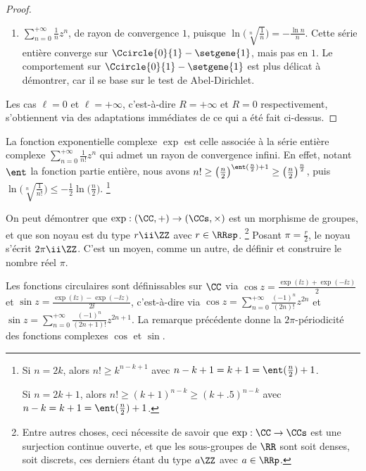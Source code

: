 \begin{proof}
\begin{itemize}
\begin{enumerate}[label=(\alph*)]
	        \item $\sum_{n=0}^{+\infty}  \frac{1}{n} z^n$, 
	        de rayon de convergence $1$,
	        puisque 
	        $ \ln \big( \sqrt[n]{\frac{1}{n}} \big)
	        = -\frac{\ln n}{n}$.
	        Cette série entière converge sur $\Ccircle{0}{1} - \setgene{1}$, mais pas en $1$. 
	        Le comportement sur $\Ccircle{0}{1} - \setgene{1}$ est plus délicat à démontrer, car il se base sur le test de Abel-Dirichlet.
	    \end{enumerate}
    \end{itemize}


    Les cas $\ell = 0$ et $\ell = +\infty$,
    c'est-à-dire $R = +\infty$ et $R = 0$ respectivement,
    s'obtiennent via des adaptations immédiates de ce qui a été fait ci-dessus.
\end{proof}


\begin{example}
	La fonction exponentielle complexe $\exp$ est celle associée à la série entière complexe $\sum_{n=0}^{+\infty} \frac{1}{n!} z^n$ qui admet un rayon de convergence infini.
	En effet,
	notant $\ent$ la fonction partie entière, nous avons
	$n! \geq \big( \frac{n}{2} \big)^{\ent (\frac{n}{2}) + 1} \geq \big( \frac{n}{2} \big)^{\frac{n}{2}}$,
	puis
	$ \ln \big( \sqrt[n]{\frac{1}{n!}} \big)
	\leq
	  - \frac{1}{2} \ln \big( \frac{n}{2} \big)$.%
	\footnote{
		Si $n = 2k$, alors $n! \geq k^{n - k + 1}$
		avec $n - k + 1 = k + 1 = \ent (\frac{n}{2}) + 1$.
		
		\leavevmode\kern7.75pt
		Si $n = 2k + 1$, alors $n! \geq (k + 1)^{n - k} \geq (k + \num{.5})^{n - k}$
		avec $n - k = k + 1 = \ent (\frac{n}{2}) + 1$.
	}
\end{example}


\begin{remark}
	On peut démontrer que
	$\exp : (\CC , {+}) \to (\CCs, {\times})$ est un morphisme de groupes, et que son noyau est du type $r \ii \ZZ$ avec $r \in \RRsp$.%
	\footnote{
	    Entre autres choses, ceci nécessite de savoir que
	    $\exp: \CC \to \CCs$ est une surjection continue ouverte,
	    et
	    que les sous-groupes de $\RR$ sont soit denses, soit discrets, ces derniers étant du type $a \ZZ$ avec $a \in \RRp$. 
	}
	Posant $\pi = \frac{r}{2}$, le noyau s'écrit $2 \pi \ii \ZZ$.
	C'est un moyen, comme un autre, de définir et construire le nombre réel $\pi$.
\end{remark}


\begin{example} \label{cos-sin-analytic}
    Les fonctions circulaires sont définissables sur $\CC$ via
    $\cos z = \frac{\exp(\ii z) + \exp(- \ii z)}{2}$
    et
    $\sin z = \frac{\exp(\ii z) - \exp(- \ii z)}{2 \ii}$,
    c'est-à-dire via
    $\cos z = \sum_{n=0}^{+\infty} \frac{(-1)^n}{(2n)!} z^{2n}$
    et
    $\sin z = \sum_{n=0}^{+\infty} \frac{(-1)^n}{(2n+ 1)!} z^{2n+1}$.
    La remarque précédente donne la $2 \pi$-périodicité des fonctions complexes $\cos$ et $\sin$.
\end{example}



